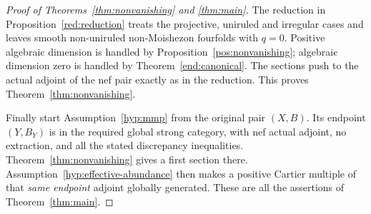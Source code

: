 \begin{proof}[Proof of Theorems~\ref{thm:nonvanishing} and
\ref{thm:main}]
The reduction in Proposition~\ref{red:reduction} treats the
projective, uniruled and irregular cases and leaves smooth
non-uniruled non-Moishezon fourfolds with \(q=0\). Positive
algebraic dimension is handled by Proposition~\ref{pos:nonvanishing};
algebraic dimension zero is handled by
Theorem~\ref{end:canonical}. The sections push to the actual
adjoint of the nef pair exactly as in the reduction. This proves
Theorem~\ref{thm:nonvanishing}.

Finally start Assumption~\ref{hyp:mmp} from the original pair
\((X,B)\). Its endpoint \((Y,B_Y)\) is in the required global
strong category, with nef actual adjoint, no extraction, and all the
stated discrepancy inequalities. Theorem~\ref{thm:nonvanishing}
gives a first section there. Assumption~\ref{hyp:effective-abundance}
then makes a positive Cartier multiple of that \emph{same endpoint}
adjoint globally generated. These are all the assertions of
Theorem~\ref{thm:main}.
\end{proof}
